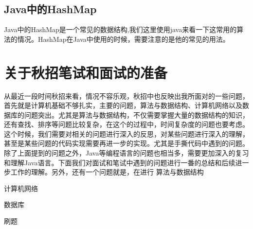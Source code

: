 \documentclass[UTF8]{ctexart}
\begin{document}
\subsection{Java中的HashMap}
Java中的HashMap是一个常见的数据结构,我们这里使用java来看一下这常用的算法的情况。HashMap在Java中使用的时候，需要注意的是他的常见的用法。






\section{关于秋招笔试和面试的准备}
从最近一段时间秋招来看，情况不容乐观，秋招中也反映出我所面对的一些问题，首先就是计算机基础不够扎实，主要的问题，算法与数据结构、计算机网络以及数据库的问题突出。尤其是算法与数据结构，不仅需要掌握大量的数据结构的知识，还有查找、排序等问题比较复杂，在这个的过程中，时间复杂度的问题也要考虑。这个时候，我们需要对相关的问题进行深入的反思，对某些问题进行深入的理解，甚至是某些问题的代码实现需要再进一步的实现。尤其是手撕代码中遇到的问题。除了上面提到的问题之外，Java等编程语言的问题也相当多，需要更加深入的复习和理解Java语言。下面我们对面试和笔试中遇到的问题进行一番的总结和后续进一步工作的理解。另外，还有一个问题就是，在进行
\newline
   算法与数据结构


\newline
   计算机网络




\newline 
数据库



\newline
刷题







\end{document}
